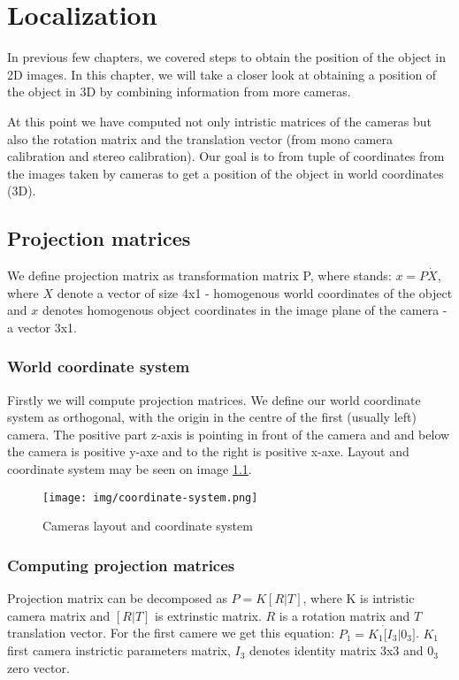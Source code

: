 \chapter{Localization}

In previous few chapters, we covered steps to obtain the position of the object in
2D images. In this chapter, we will take a closer look at obtaining a position of
the object in 3D by combining information from more cameras.

At this point we have computed not only intristic matrices of the cameras but
also the rotation matrix and the translation vector (from mono camera calibration
and stereo calibration). Our goal is to from tuple of coordinates from the
images taken by cameras to get a position of the object in world coordinates
(3D).

\section{Projection matrices}
We define projection matrix as transformation matrix P, where stands: $x = P
\dot X$, where $X$ denote a vector of size 4x1 - homogenous world coordinates
of the object and $x$ denotes homogenous object coordinates in the image plane
of the camera - a vector 3x1.

\subsection{World coordinate system}
Firstly we will compute projection matrices. We define our world coordinate
system as orthogonal, with the origin in the centre of the first (usually left)
camera. The positive part z-axis is pointing in front of the camera and and
below the camera is positive y-axe and to the right is positive x-axe. Layout and coordinate system may be seen on image \ref{fig:coordinate-system}.

\begin{figure}
\centering
\texttt{[image: img/coordinate-system.png]}
\caption{Cameras layout and coordinate system}
\label{fig:coordinate-system}
\end{figure}

\subsection{Computing projection matrices}
Projection matrix can be decomposed as $P = K[R|T]$, where K is intristic
camera matrix and $[R|T]$ is extrinstic matrix. $R$ is a rotation matrix and
$T$ translation vector. For the first camere we get this equation: $ P_1 = K_1
\dot [I_3 | 0_3]$. $K_1$ first camera instrictic parameters matrix, $I_3$
denotes identity matrix 3x3 and $0_3$ zero vector.

